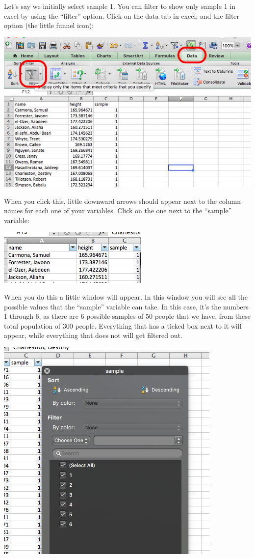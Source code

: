 \documentclass[]{book}
\theoremstyle{definition}
\theoremstyle{definition}
\theoremstyle{definition}
\theoremstyle{remark}
\begin{document}
Let's say we initially select sample 1. You can filter to show only
sample 1 in excel by using the ``filter'' option. Click on the data tab
in excel, and the filter option (the little funnel icon):

\includegraphics{imgs/filter_data.png}

When you click this, little downward arrows should appear next to the
column names for each one of your variables. Click on the one next to
the ``sample'' variable:

\includegraphics{imgs/filter_arrows.png}

When you do this a little window will appear. In this window you will
see all the possible values that the ``sample'' variable can take. In
this case, it's the numbers 1 through 6, as there are 6 possible samples
of 50 people that we have, from these total population of 300 people.
Everything that has a ticked box next to it will appear, while
everything that does not will get filtered out.

\includegraphics{imgs/filter_options.png}
\end{document}
